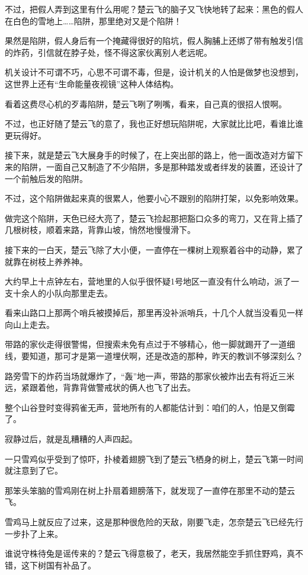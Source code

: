 不过，把假人弄到这里有什么用呢？楚云飞的脑子又飞快地转了起来：黑色的假人在白色的雪地上……陷阱，那里绝对又是个陷阱！

果然是陷阱，假人身后有一个掩藏得很好的陷坑，假人胸脯上还绑了带有触发引信的炸药，引信就在脖子处，怪不得这家伙离别人老远呢。

机关设计不可谓不巧，心思不可谓不毒，但是，设计机关的人怕是做梦也没想到，这世界上还有“生命能量夜视镜”这种人体结构。

看着这费尽心机的歹毒陷阱，楚云飞咧了咧嘴，看来，自己真的很招人恨啊。

不过，也正好随了楚云飞的意了，我也正好想玩陷阱呢，大家就比比吧，看谁比谁更玩得好。

接下来，就是楚云飞大展身手的时候了，在上突出部的路上，他一面改造对方留下来的陷阱，一面自己又制造了不少陷阱，多是那种踏发或者绊发的装置，还设计了一个前触后发的陷阱。

不过，这个陷阱做起来真的很累人，他要小心不跟别的陷阱打架，以免影响效果。

做完这个陷阱，天色已经大亮了，楚云飞捡起那把豁口众多的弯刀，又在背上插了几根树枝，顺着来路，背靠山坡，悄然地慢慢滑下。

接下来的一白天，楚云飞除了大小便，一直停在一棵树上观察着谷中的动静，累了就靠在树枝上养养神。

大约早上十点钟左右，营地里的人似乎很怀疑1号地区一直没有什么响动，派了一支十余人的小队向那里走去。

看来山路口上那两个哨兵被摸掉后，那里再没补派哨兵，十几个人就当没看见一样向山上走去。

带路的家伙走得很警惕，但搜索未免有点过于不够精心，他一脚就踢开了一道细线，要知道，那可才是第一道埋伏啊，还是改造的那种，昨天的教训不够深刻么？

路旁雪下的炸药当场就爆炸了，“轰”地一声，带路的那家伙被炸出去有将近三米远，紧跟着他，背靠背做警戒状的俩人也飞了出去。

整个山谷登时变得鸦雀无声，营地所有的人都能估计到：咱们的人，怕是又倒霉了。

寂静过后，就是乱糟糟的人声四起。

一只雪鸡似乎受到了惊吓，扑棱着翅膀飞到了楚云飞栖身的树上，楚云飞第一时间就注意到了它。

那笨头笨脑的雪鸡刚在树上扑扇着翅膀落下，就发现了一直停在那里不动的楚云飞。

雪鸡马上就反应了过来，这是那种很危险的天敌，刚要飞走，怎奈楚云飞已经先行一步扑了上来。

谁说守株待兔是谣传来的？楚云飞得意极了，老天，我居然能空手抓住野鸡，真不错，这下树国有补品了。


